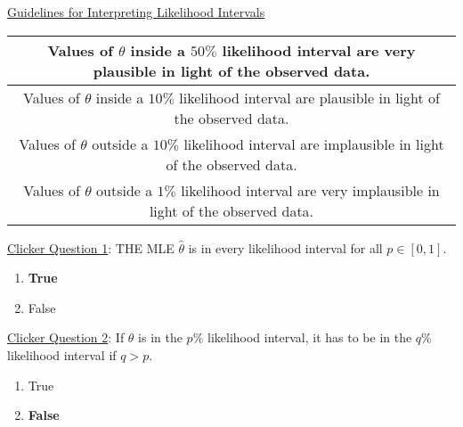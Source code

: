 \begin{center}
    \underline{Guidelines for Interpreting Likelihood Intervals}
\end{center}
\begin{center}
    \begin{tabular}{|c|}
        \hline
        Values of $ \theta $ inside a $ 50\% $ likelihood interval are very plausible in light of
        the observed data. \\
        \hline
        Values of $ \theta $ inside a $ 10\% $ likelihood interval are plausible in light of
        the observed data. \\
        \hline
        Values of $ \theta $ outside a $ 10\% $ likelihood interval are implausible in light of
        the observed data. \\
        \hline
        Values of $ \theta $ outside a $ 1\% $ likelihood interval are very implausible in light of
        the observed data. \\
        \hline
    \end{tabular}
\end{center}
\underline{Clicker Question 1}: THE MLE $ \hat{\theta} $ is in every likelihood
interval for all $ p\in[0,1] $.
\begin{enumerate}[label=(\alph*)]
    \item \textbf{True}
    \item False
\end{enumerate}
\underline{Clicker Question 2}: If $ \theta $ is in the $ p\% $ likelihood
interval, it has to be in the $ q\% $ likelihood interval if $ q>p $.
\begin{enumerate}[label=(\alph*)]
    \item True
    \item \textbf{False}
\end{enumerate}
